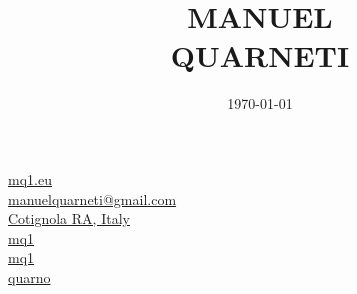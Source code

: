 \documentclass{article}
\title{\vspace{-40pt} \HUGE \textbf{MANUEL} \\[-20pt] QUARNETI \vspace{-40pt}}
\author{}
\date{\today}
\begin{document}
\begin{paracol}{3}

    \switchcolumn

    \maketitle

    \switchcolumn

    \begin{flushright}
        \href{https://mq1.eu/}{mq1.eu} \ \faGlobe \\
        \href{mailto:manuelquarneti@gmail.com}{manuelquarneti@gmail.com} \ \faEnvelope \\
        \href{https://www.openstreetmap.org/relation/43112}{Cotignola RA, Italy} \ \faCity \\
        \href{https://github.com/mq1}{mq1} \ \faGithub \\
        \href{https://www.linkedin.com/in/mq1}{mq1} \ \faLinkedin \\
        \href{https://t.me/quarno}{quarno} \ \faTelegram
    \end{flushright}
\end{paracol}
\end{document}
